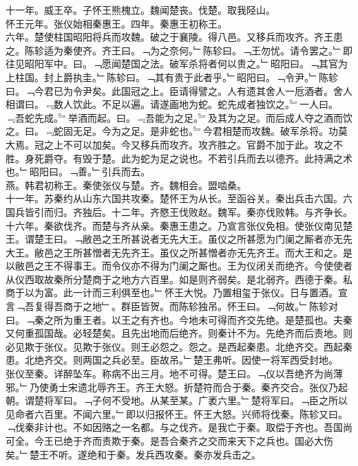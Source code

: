 \documentclass{zhvt-classic}
\begin{document}
\hspace*{2em}十一年。威王卒。子怀王熊槐立。魏闻楚丧。伐楚。取我陉山。\\
\hspace*{2em}怀王元年。张仪始相秦惠王。四年。秦惠王初称王。\\
\hspace*{2em}六年。楚使柱国昭阳将兵而攻魏。破之于襄陵。得八邑。又移兵而攻齐。齐王患之。陈轸适为秦使齐。齐王曰。﹁为之奈何。﹂陈轸曰。﹁王勿忧。请令罢之。﹂即往见昭阳军中。曰。﹁愿闻楚国之法。破军杀将者何以贵之。﹂昭阳曰。﹁其官为上柱国。封上爵执圭。﹂陈轸曰。﹁其有贵于此者乎。﹂昭阳曰。﹁令尹。﹂陈轸曰。﹁今君已为令尹矣。此国冠之上。臣请得譬之。人有遗其舍人一卮酒者。舍人相谓曰。﹃数人饮此。不足以遍。请遂画地为蛇。蛇先成者独饮之。﹄一人曰。﹃吾蛇先成。﹄举酒而起。曰。﹃吾能为之足。﹄及其为之足。而后成人夺之酒而饮之。曰。﹃蛇固无足。今为之足。是非蛇也。﹄今君相楚而攻魏。破军杀将。功莫大焉。冠之上不可以加矣。今又移兵而攻齐。攻齐胜之。官爵不加于此。攻之不胜。身死爵夺。有毁于楚。此为蛇为足之说也。不若引兵而去以德齐。此持满之术也。﹂昭阳曰。﹁善。﹂引兵而去。\\
\hspace*{2em}燕。韩君初称王。秦使张仪与楚。齐。魏相会。盟啮桑。\\
\hspace*{2em}十一年。苏秦约从山东六国共攻秦。楚怀王为从长。至函谷关。秦出兵击六国。六国兵皆引而归。齐独后。十二年。齐愍王伐败赵。魏军。秦亦伐败韩。与齐争长。\\
\hspace*{2em}十六年。秦欲伐齐。而楚与齐从亲。秦惠王患之。乃宣言张仪免相。使张仪南见楚王。谓楚王曰。﹁敝邑之王所甚说者无先大王。虽仪之所甚愿为门阑之厮者亦无先大王。敝邑之王所甚憎者无先齐王。虽仪之所甚憎者亦无先齐王。而大王和之。是以敝邑之王不得事王。而令仪亦不得为门阑之厮也。王为仪闭关而绝齐。今使使者从仪西取故秦所分楚商于之地方六百里。如是则齐弱矣。是北弱齐。西德于秦。私商于以为富。此一计而三利俱至也。﹂怀王大悦。乃置相玺于张仪。日与置酒。宣言﹁吾复得吾商于之地﹂。群臣皆贺。而陈轸独吊。怀王曰。﹁何故。﹂陈轸对曰。﹁秦之所为重王者。以王之有齐也。今地未可得而齐交先绝。是楚孤也。夫秦又何重孤国哉。必轻楚矣。且先出地而后绝齐。则秦计不为。先绝齐而后责地。则必见欺于张仪。见欺于张仪。则王必怨之。怨之。是西起秦患。北绝齐交。西起秦患。北绝齐交。则两国之兵必至。臣故吊。﹂楚王弗听。因使一将军西受封地。\\
\hspace*{2em}张仪至秦。详醉坠车。称病不出三月。地不可得。楚王曰。﹁仪以吾绝齐为尚薄邪。﹂乃使勇士宋遗北辱齐王。齐王大怒。折楚符而合于秦。秦齐交合。张仪乃起朝。谓楚将军曰。﹁子何不受地。从某至某。广袤六里。﹂楚将军曰。﹁臣之所以见命者六百里。不闻六里。﹂即以归报怀王。怀王大怒。兴师将伐秦。陈轸又曰。﹁伐秦非计也。不如因赂之一名都。与之伐齐。是我亡于秦。取偿于齐也。吾国尚可全。今王已绝于齐而责欺于秦。是吾合秦齐之交而来天下之兵也。国必大伤矣。﹂楚王不听。遂绝和于秦。发兵西攻秦。秦亦发兵击之。\\
\end{document}
